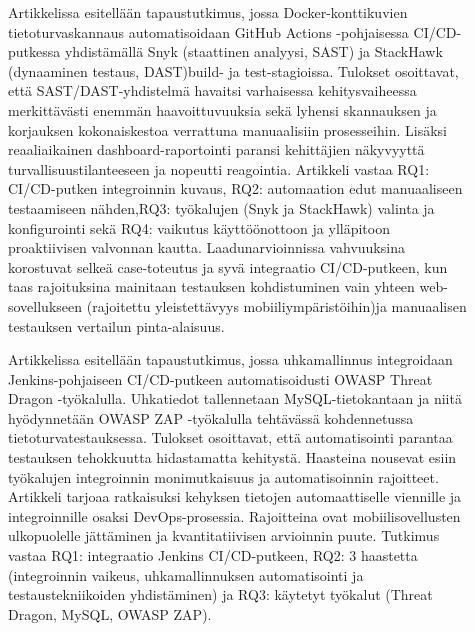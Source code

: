 \documentclass[bscthesis,finnish,oneside,biblatex]{uefcsthesis}
\begin{document}
\begin{description}
    \item[\cite{marandi2023_ias}] Artikkelissa esitellään tapaustutkimus, jossa Docker-konttikuvien tietoturvaskannaus automatisoidaan GitHub Actions -pohjaisessa CI/CD-putkessa yhdistämällä Snyk (staattinen analyysi, SAST) ja StackHawk (dynaaminen testaus, DAST)build- ja test-stagioissa. Tulokset osoittavat, että SAST/DAST-yhdistelmä havaitsi varhaisessa kehitysvaiheessa merkittävästi enemmän haavoittuvuuksia sekä lyhensi skannauksen ja korjauksen kokonaiskestoa verrattuna manuaalisiin prosesseihin. Lisäksi reaaliaikainen dashboard-raportointi paransi kehittäjien näkyvyyttä turvallisuustilanteeseen ja nopeutti reagointia. Artikkeli vastaa RQ1: CI/CD-putken integroinnin kuvaus, RQ2: automaation edut manuaaliseen testaamiseen nähden,RQ3: työkalujen (Snyk ja StackHawk) valinta ja konfigurointi sekä RQ4: vaikutus käyttöönottoon ja ylläpitoon proaktiivisen valvonnan kautta. Laadunarvioinnissa vahvuuksina korostuvat selkeä case-toteutus ja syvä integraatio CI/CD-putkeen, kun taas rajoituksina mainitaan testauksen kohdistuminen vain yhteen web-sovellukseen (rajoitettu yleistettävyys mobiiliympäristöihin)ja manuaalisen testauksen vertailun pinta-alaisuus.
\end{description}

\begin{description}
    \item[\cite{nikolov2024_fit}] Artikkelissa esitellään tapaustutkimus, jossa uhkamallinnus integroidaan Jenkins-pohjaiseen CI/CD-putkeen automatisoidusti OWASP Threat Dragon -työkalulla. Uhkatiedot tallennetaan MySQL-tietokantaan ja niitä hyödynnetään OWASP ZAP -työkalulla tehtävässä kohdennetussa tietoturvatestauksessa. Tulokset osoittavat, että automatisointi parantaa testauksen tehokkuutta hidastamatta kehitystä. Haasteina nousevat esiin työkalujen integroinnin monimutkaisuus ja automatisoinnin rajoitteet. Artikkeli tarjoaa ratkaisuksi kehyksen tietojen automaattiselle viennille ja integroinnille osaksi DevOps-prosessia. Rajoitteina ovat mobiilisovellusten ulkopuolelle jättäminen ja kvantitatiivisen arvioinnin puute. Tutkimus vastaa RQ1: integraatio Jenkins CI/CD-putkeen, RQ2: 3 haastetta (integroinnin vaikeus, uhkamallinnuksen automatisointi ja testaustekniikoiden yhdistäminen) ja RQ3: käytetyt työkalut (Threat Dragon, MySQL, OWASP ZAP).
\end{description}
\end{document}
